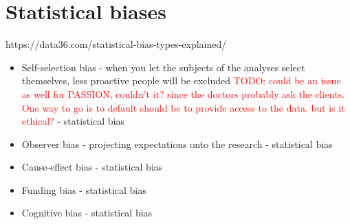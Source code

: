 \documentclass[12pt, a4paper, oneside]{book}   	%
\renewcommand{\todo}[1]{\textcolor{red}{TODO: #1}}
\begin{document}
		\section{Statistical biases}
			https://data36.com/statistical-bias-types-explained/
			\begin{itemize}
				\item Self-selection bias - when you let the subjects of the analyses select themselves, less proactive people will be excluded \todo{could be an issue as well for PASSION, couldn't it? since the doctors probably ask the clients. One way to go is to default should be to provide access to the data. but is it ethical?} \autocites{Mester_2022}{Mester_2017}- statistical bias
				\item Observer bias - projecting expectations onto the research \autocites{Mester_2022}{Mester_2017} - statistical bias
				\item Cause-effect bias \autocites{Mester_2022}{Mester_2017} - statistical bias
				\item Funding bias \autocites{Mester_2022}{Mester_2017} - statistical bias
				\item Cognitive bias \autocites{Mester_2022}{Mester_2017} - statistical bias
			\end{itemize}	
	
\end{document}
